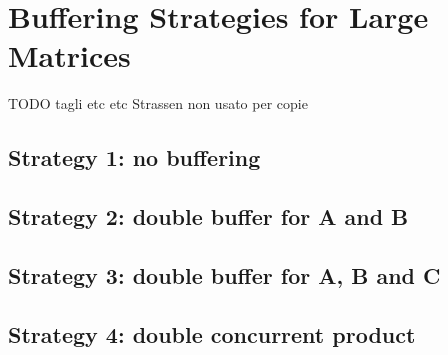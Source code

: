\section{Buffering Strategies for Large Matrices}
\label{sec:strategies}

TODO tagli etc etc Strassen non usato per copie
\subsection{Strategy 1: no buffering}
\subsection{Strategy 2: double buffer for A and B}
\subsection{Strategy 3: double buffer for A, B and C}
\subsection{Strategy 4: double concurrent product}
